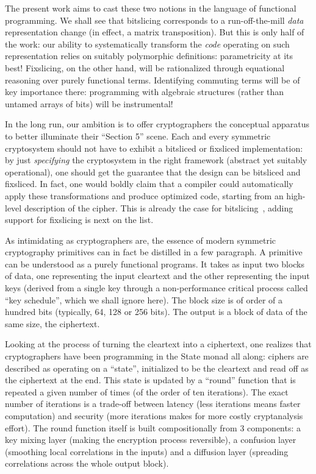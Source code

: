 \documentclass[draft,english]{jflart}
\begin{document}
The present work aims to cast these two notions in the language of
functional programming. We shall see that bitslicing corresponds to a
run-off-the-mill \emph{data} representation change (in effect, a
matrix transposition). But this is only half of the work: our ability
to systematically transform the \emph{code} operating on such
representation relies on suitably polymorphic definitions:
parametricity at its best! Fixslicing, on the other hand, will be
rationalized through equational reasoning over purely functional
terms. Identifying commuting terms will be of key importance there:
programming with algebraic structures (rather than untamed arrays of
bits) will be instrumental!

In the long run, our ambition is to offer cryptographers the
conceptual apparatus to better illuminate their ``Section 5'' scene.
Each and every symmetric cryptosystem should not have to exhibit a
bitsliced or fixsliced implementation: by just \emph{specifying} the
cryptosystem in the right framework (abstract yet suitably
operational), one should get the guarantee that the design can be
bitsliced and fixsliced. In fact, one would boldly claim that a
compiler could automatically apply these transformations and produce
optimized code, starting from an high-level description of the cipher.
This is already the case for bitslicing~\citep{usuba}, adding support
for fixslicing is next on the list.


As intimidating as cryptographers are, the essence of modern symmetric
cryptography primitives can in fact be distilled in a few paragraph. A
primitive can be understood as a purely functional programs. It takes
as input two blocks of data, one representing the input cleartext and
the other representing the input keys (derived from a single key
through a non-performance critical process called ``key schedule'',
which we shall ignore here). The block size is of order of a hundred
bits (typically, 64, 128 or 256 bits). The output is a block of data
of the same size, the ciphertext.

Looking at the process of turning the cleartext into a ciphertext, one
realizes that cryptographers have been programming in the State monad
all along: ciphers are described as operating on a ``state'',
initialized to be the cleartext and read off as the ciphertext at the
end. This state is updated by a ``round'' function that is repeated a
given number of times (of the order of ten iterations). The exact
number of iterations is a trade-off between latency (less iterations
means faster computation) and security (more iterations makes for more
costly cryptanalysis effort). The round function itself is built
compositionally from 3 components: a key mixing layer (making the
encryption process reversible), a confusion layer (smoothing local
correlations in the inputs) and a diffusion layer (spreading
correlations across the whole output block).
\end{document}
